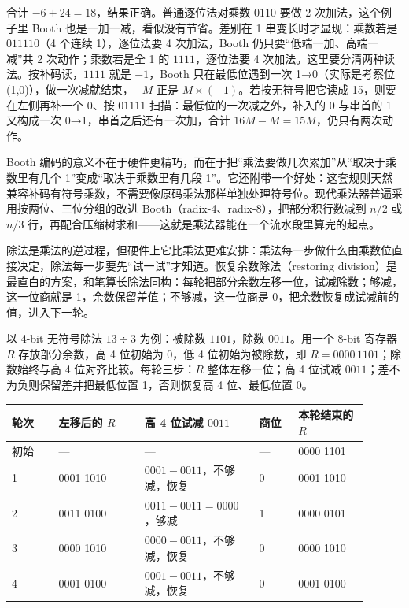 合计 $-6+24=18$，结果正确。普通逐位法对乘数 $0110$ 要做 2 次加法，这个例子里 Booth 也是一加一减，看似没有节省。差别在 1 串变长时才显现：乘数若是 $011110$（4 个连续 1），逐位法要 4 次加法，Booth 仍只要“低端一加、高端一减”共 2 次动作；乘数若是全 1 的 $1111$，逐位法要 4 次加法。这里要分清两种读法。按补码读，$1111$ 就是 $-1$，Booth 只在最低位遇到一次 1→0（实际是考察位 (1,0)），做一次减就结束，$-M$ 正是 $M\times(-1)$。若按无符号把它读成 15，则要在左侧再补一个 0、按 $01111$ 扫描：最低位的一次减之外，补入的 0 与串首的 1 又构成一次 0→1，串首之后还有一次加，合计 $16M-M=15M$，仍只有两次动作。

Booth 编码的意义不在于硬件更精巧，而在于把“乘法要做几次累加”从“取决于乘数里有几个 1”变成“取决于乘数里有几段 1”。它还附带一个好处：这套规则天然兼容补码有符号乘数，不需要像原码乘法那样单独处理符号位。现代乘法器普遍采用按两位、三位分组的改进 Booth（radix-4、radix-8），把部分积行数减到 $n/2$ 或 $n/3$ 行，再配合压缩树求和——这就是乘法器能在一个流水段里算完的起点。


除法是乘法的逆过程，但硬件上它比乘法更难安排：乘法每一步做什么由乘数位直接决定，除法每一步要先“试一试”才知道。恢复余数除法（restoring division）是最直白的方案，和笔算长除法同构：每轮把部分余数左移一位，试减除数；够减，这一位商就是 1，余数保留差值；不够减，这一位商是 0，把余数恢复成试减前的值，进入下一轮。

以 4-bit 无符号除法 $13\div3$ 为例：被除数 $1101$，除数 $0011$。用一个 8-bit 寄存器 $R$ 存放部分余数，高 4 位初始为 0，低 4 位初始为被除数，即 $R=0000\,1101$；除数始终与高 4 位对齐比较。每轮三步：$R$ 整体左移一位；高 4 位试减 $0011$；差不为负则保留差并把最低位置 1，否则恢复高 4 位、最低位置 0。

\begin{longtable}{L{0.12\linewidth}L{0.22\linewidth}L{0.28\linewidth}L{0.1\linewidth}L{0.18\linewidth}}
\toprule
轮次 & 左移后的 $R$ & 高 4 位试减 $0011$ & 商位 & 本轮结束的 $R$ \\
\midrule
初始 & --- & --- & --- & 0000 1101 \\
1 & 0001 1010 & $0001-0011$，不够减，恢复 & 0 & 0001 1010 \\
2 & 0011 0100 & $0011-0011=0000$，够减 & 1 & 0000 0101 \\
3 & 0000 1010 & $0000-0011$，不够减，恢复 & 0 & 0000 1010 \\
4 & 0001 0100 & $0001-0011$，不够减，恢复 & 0 & 0001 0100 \\
\bottomrule
\end{longtable}


